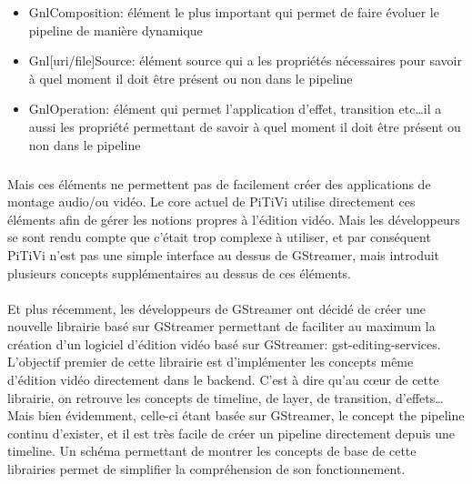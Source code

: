 \begin{itemize}

  \item {GnlComposition: élément le plus important qui permet de faire
  évoluer le pipeline de manière dynamique}

  \item{Gnl[uri/file]Source: élément source qui a les propriétés
    nécessaires pour savoir à quel moment il doit être présent ou
    non dans le pipeline}

  \item{GnlOperation: élément qui permet l'application d'effet,
  transition etc\ldots il a aussi les propriété permettant de savoir
  à quel
    moment il doit être présent ou non dans le pipeline}

\end{itemize}

\subparagraph{}

Mais ces éléments ne permettent pas de facilement créer des
applications de montage audio/ou vidéo. Le core actuel de PiTiVi
utilise directement ces éléments afin de gérer les notions propres
à l'édition vidéo.  Mais les développeurs se sont rendu compte que
c'était trop complexe à utiliser, et par conséquent PiTiVi n'est pas
une simple interface au dessus de GStreamer, mais introduit plusieurs
concepts supplémentaires au dessus de ces éléments.

\paragraph{}

Et plus récemment, les développeurs de GStreamer ont décidé de créer
une nouvelle librairie basé sur GStreamer permettant de faciliter
au maximum la création d'un logiciel d'édition vidéo basé sur
GStreamer: gst-editing-services.  L'objectif premier de cette librairie
est d'implémenter les concepts même d'édition vidéo directement dans
le backend. C'est à dire qu'au cœur de cette librairie, on retrouve
les concepts de timeline, de layer, de transition, d'effets\ldots Mais
bien évidemment, celle-ci étant basée sur GStreamer, le concept
the pipeline continu d'exister, et il est très facile de créer un
pipeline directement depuis une timeline. Un schéma permettant de
montrer les concepts de base de cette librairies permet de simplifier
la compréhension de son fonctionnement.

